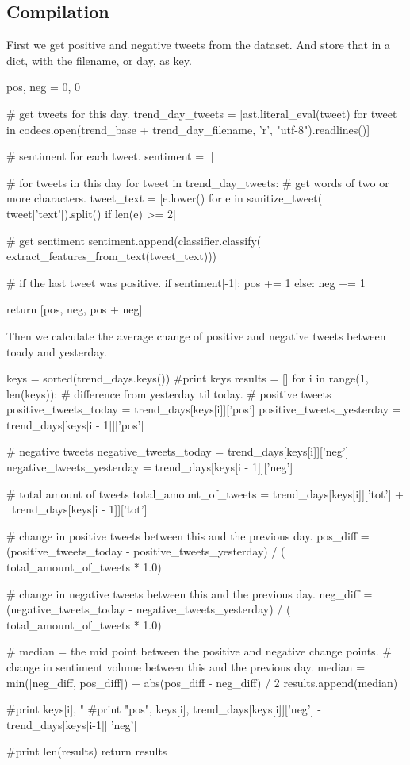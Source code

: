 \subsection{Compilation}

First we get positive and negative tweets from the dataset. And store that in a
dict, with the filename, or day, as key. 
\begin{python}
pos, neg = 0, 0

# get tweets for this day.
trend_day_tweets = [ast.literal_eval(tweet) for tweet in
    codecs.open(trend_base + trend_day_filename, 
                'r',
                "utf-8").readlines()]

# sentiment for each tweet.
sentiment = []

# for tweets in this day
for tweet in trend_day_tweets:
    # get words of two or more characters.
    tweet_text = [e.lower() for e in sanitize_tweet(
          tweet['text']).split() if len(e) >= 2]

	# get sentiment
    sentiment.append(classifier.classify(
        extract_features_from_text(tweet_text)))

    # if the last tweet was positive.
    if sentiment[-1]:
        pos += 1
    else:
        neg += 1

return [pos, neg, pos + neg]
\end{python}

Then we calculate the average change of positive and negative tweets between
toady and yesterday. 
\begin{python}
keys = sorted(trend_days.keys())
#print keys
results = []
for i in range(1, len(keys)):
    # difference from yesterday til today.
    # positive tweets
    positive_tweets_today = trend_days[keys[i]]['pos']
    positive_tweets_yesterday = trend_days[keys[i - 1]]['pos']

    # negative tweets
    negative_tweets_today = trend_days[keys[i]]['neg']
    negative_tweets_yesterday = trend_days[keys[i - 1]]['neg']

    # total amount of tweets
    total_amount_of_tweets = trend_days[keys[i]]['tot'] + \
                             trend_days[keys[i - 1]]['tot']

    # change in positive tweets between this and the previous day.
    pos_diff = (positive_tweets_today - positive_tweets_yesterday) / (
        total_amount_of_tweets * 1.0)

    # change in negative tweets between this and the previous day.
    neg_diff = (negative_tweets_today - negative_tweets_yesterday) / (
        total_amount_of_tweets * 1.0)

    # median = the mid point between the positive and negative change
points.
    # change in sentiment volume between this and the previous day.
    median = min([neg_diff, pos_diff]) + abs(pos_diff - neg_diff) / 2
    results.append(median)

    #print keys[i], "%
    #print "pos", keys[i], trend_days[keys[i]]['neg'] -
trend_days[keys[i-1]]['neg']

#print len(results)
return results
\end{python}

